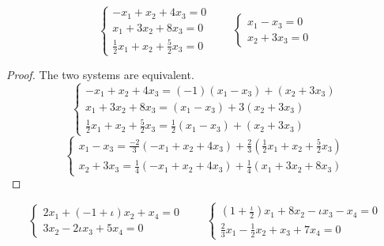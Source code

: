\begin{exercise}
    \[
        \begin{cases}
            -x_{1} + x_{2} + 4x_{3} = 0 \\
            x_{1} + 3x_{2} + 8x_{3} = 0 \\
            \frac{1}{2}x_{1} + x_{2} + \frac{5}{2}x_{3} = 0
        \end{cases}
        \qquad
        \begin{cases}
            x_{1} - x_{3} = 0 \\
            x_{2} + 3x_{3} = 0
        \end{cases}
    \]
\end{exercise}

\begin{proof}
    The two systems are equivalent.
    \[
        \begin{cases}
            -x_{1} + x_{2} + 4x_{3} = (-1)(x_{1} - x_{3}) + (x_{2} + 3x_{3}) \\
            x_{1} + 3x_{2} + 8x_{3} = (x_{1} - x_{3}) + 3(x_{2} + 3x_{3})    \\
            \frac{1}{2}x_{1} + x_{2} + \frac{5}{2}x_{3} = \frac{1}{2}(x_{1} - x_{3}) + (x_{2} + 3x_{3})
        \end{cases}
    \]
    \[
        \begin{cases}
            x_{1} - x_{3} = \frac{-2}{3}(-x_{1} + x_{2} + 4x_{3}) + \frac{2}{3}(\frac{1}{2}x_{1} + x_{2} + \frac{5}{2}x_{3}) \\
            x_{2} + 3x_{3} = \frac{1}{4}(-x_{1} + x_{2} + 4x_{3}) + \frac{1}{4}(x_{1} + 3x_{2} + 8x_{3})
        \end{cases}
    \]
\end{proof}

\begin{exercise}
    \[
        \begin{cases}
            2x_{1} + (-1 + \iota)x_{2} + x_{4} = 0 \\
            3x_{2} - 2\iota x_{3} + 5x_{4} = 0
        \end{cases}
        \qquad
        \begin{cases}
            \left(1 + \frac{\iota}{2}\right)x_{1} + 8x_{2} - \iota x_{3} - x_{4} = 0 \\
            \frac{2}{3}x_{1} - \frac{1}{2}x_{2} + x_{3} + 7x_{4} = 0
        \end{cases}
    \]
\end{exercise}

